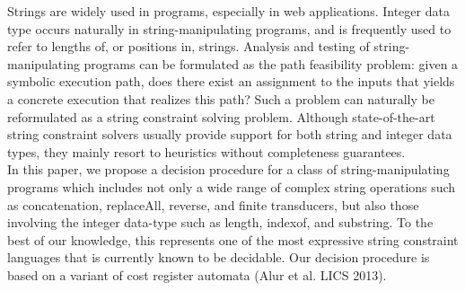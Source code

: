 
Strings are widely used in programs, especially in web applications.
Integer data type occurs naturally in string-manipulating programs, and is
frequently used to refer to lengths of, or positions in, strings. 
Analysis and testing of string-manipulating programs can be formulated as the 
path feasibility problem:
given a symbolic execution path, does there exist an assignment to the inputs 
that yields a concrete execution that realizes this path?
Such a problem can naturally be reformulated as a string constraint solving
problem.
Although state-of-the-art string constraint solvers usually provide support for both string and integer data types,   
they mainly resort to heuristics without completeness guarantees. \\ %
%
In this paper, we propose a decision procedure 
for a class of string-manipulating programs
which includes  not only a wide range of complex string operations such as concatenation, replaceAll, reverse, and finite transducers, but also those involving the integer data-type such as length, indexof, and substring. To the best of our knowledge, this represents one of the most expressive string constraint languages that is currently known to be decidable.  Our decision procedure is based on 
a variant of cost register automata (Alur et al. LICS 2013). 

